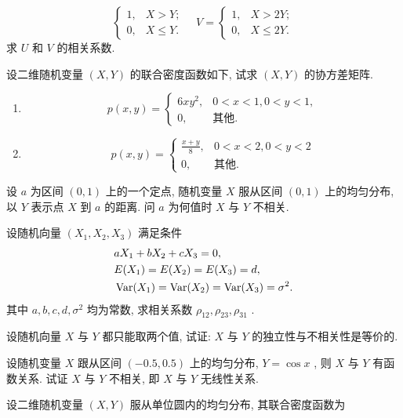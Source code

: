 \begin{xiti}
\begin{equation*}
\begin{cases}
						1, & X>Y;\\
						0, & X\leqslant Y.
					\end{cases}\quad
					V=\begin{cases}
						1, & X>2Y;\\
						0, & X\leqslant 2Y.
					\end{cases}
				\end{equation*}
				求 $U$ 和 $V$ 的相关系数.
			\item 设二维随机变量 $(X,Y)$ 的联合密度函数如下, 试求 $(X,Y)$ 的协方差矩阵.
				\begin{enumerate}
					\item \begin{equation*}
						p(x,y)=\begin{cases}
							6xy^2, & 0<x<1,0<y<1,\\
							0, & \text{其他}.
						\end{cases}
					\end{equation*}
					\item \begin{equation*}
						p(x,y)=\begin{cases}
							\frac{x+y}{8}, & 0<x<2,0<y<2\\
							0, & \text{其他}.
						\end{cases}
					\end{equation*}
				\end{enumerate}
			\item 设 $a$ 为区间 $(0,1)$ 上的一个定点, 随机变量 $X$ 服从区间 $(0,1)$ 上的均匀分布, 以 $Y$ 表示点 $X$ 到 $a$ 的距离. 问 $a$ 为何值时 $X$ 与 $Y$ 不相关.
			\item 设随机向量 $(X_1,X_2,X_3)$ 满足条件
				\begin{align*}
					&aX_1+bX_2+cX_3=0,\\
					&E(X_1)=E(X_2)=E(X_3)=d,\\
					&\operatorname{Var}(X_1)=\operatorname{Var}(X_2)=\operatorname{Var}(X_3)=\sigma^2.
				\end{align*}
				其中 $a, b, c, d, \sigma^{2}$ 均为常数, 求相关系数 $\rho_{12},\rho_{23},\rho_{31}$ .
			\item 设随机向量 $X$ 与 $Y$ 都只能取两个值, 试证: $X$ 与 $Y$ 的独立性与不相关性是等价的.
			\item 设随机变量 $X$ 跟从区间 $(-0.5,0.5)$ 上的均匀分布, $Y=\cos x$ , 则 $X$ 与 $Y$ 有函数关系. 试证 $X$ 与 $Y$ 不相关, 即 $X$ 与 $Y$ 无线性关系.
			\item 设二维随机变量 $(X,Y)$ 服从单位圆内的均匀分布, 其联合密度函数为
				\begin{equation*}

\end{equation*}
\end{xiti}
